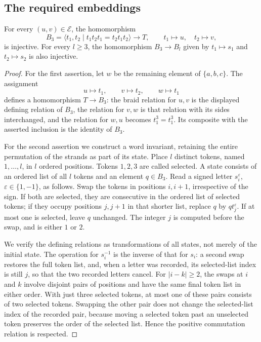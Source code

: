 \subsection{The required embeddings}

\begin{lemma}\label{lem:pair-embeddings}
For every $(u,v)\in\mathcal E$, the homomorphism
\[
 B_3=\langle t_1,t_2\mid t_1t_2t_1=t_2t_1t_2\rangle
 \longrightarrow T,
 \qquad t_1\longmapsto u,\quad t_2\longmapsto v,
\]
is injective.  For every $l\ge3$, the homomorphism $B_3\to B_l$
given by $t_1\mapsto s_1$ and $t_2\mapsto s_2$ is also injective.
\end{lemma}

\begin{proof}
For the first assertion, let $w$ be the remaining element of
$\{a,b,c\}$.  The assignment
\[
 u\longmapsto t_1,\qquad v\longmapsto t_2,
 \qquad w\longmapsto t_1
\]
defines a homomorphism $T\to B_3$: the braid relation for $u,v$ is
the displayed defining relation of $B_3$, the relation for $v,w$ is
that relation with its sides interchanged, and the relation for $w,u$
becomes $t_1^3=t_1^3$.  Its composite with the asserted inclusion is
the identity of $B_3$.

For the second assertion we construct a word invariant, retaining
the entire permutation of the strands as part of its state.  Place
$l$ distinct tokens, named $1,\ldots,l$, in $l$ ordered positions.
Tokens $1,2,3$ are called selected.  A state consists of an ordered
list of all $l$ tokens and an element $q\in B_3$.  Read a signed
letter $s_i^{\varepsilon}$, $\varepsilon\in\{1,-1\}$, as follows.
Swap the tokens in positions $i,i+1$, irrespective of the sign.
If both are selected, they are consecutive in the ordered list of
selected tokens; if they occupy positions $j,j+1$ in that shorter
list, replace $q$ by $qt_j^{\varepsilon}$.  If at most one is selected,
leave $q$ unchanged.  The integer $j$ is computed before the swap,
and is either $1$ or $2$.

We verify the defining relations as transformations of all states,
not merely of the initial state.  The operation for $s_i^{-1}$ is
the inverse of that for $s_i$: a second swap restores the full token
list, and, when a letter was recorded, its selected-list index is
still $j$, so that the two recorded letters cancel.  For
$|i-k|\ge2$, the swaps at $i$ and $k$ involve disjoint pairs of
positions and have the same final token list in either order.
With just three selected tokens, at most one of these pairs consists
of two selected tokens.  Swapping the other pair does not change
the selected-list index of the recorded pair, because moving a
selected token past an unselected token preserves the order of the
selected list.  Hence the positive commutation relation is respected.


\end{proof}
